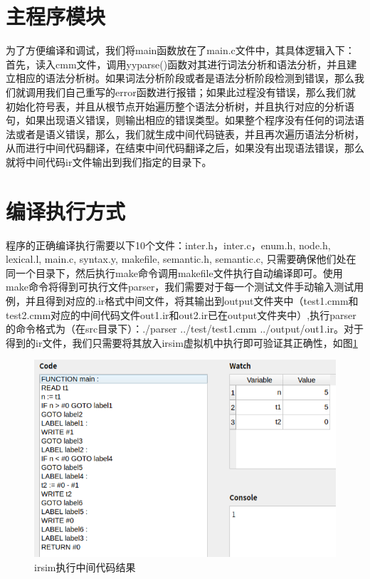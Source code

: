 \documentclass[lang=cn,11pt,a4paper,cite=authoryear]{elegantpaper}
\begin{document}
\section{主程序模块}
为了方便编译和调试，我们将main函数放在了main.c文件中，其具体逻辑入下：首先，读入cmm文件，调用yyparse()函数对其进行词法分析和语法分析，并且建立相应的语法分析树。如果词法分析阶段或者是语法分析阶段检测到错误，那么我们就调用我们自己重写的error函数进行报错；如果此过程没有错误，那么我们就初始化符号表，并且从根节点开始遍历整个语法分析树，并且执行对应的分析语句，如果出现语义错误，则输出相应的错误类型。如果整个程序没有任何的词法语法或者是语义错误，那么，我们就生成中间代码链表，并且再次遍历语法分析树，从而进行中间代码翻译，在结束中间代码翻译之后，如果没有出现语法错误，那么就将中间代码ir文件输出到我们指定的目录下。
\section{编译执行方式}
程序的正确编译执行需要以下10个文件：inter.h，inter.c，enum.h, node.h, lexical.l, main.c, syntax.y, makefile, semantic.h, semantic.c, 只需要确保他们处在同一个目录下，然后执行make命令调用makefile文件执行自动编译即可。使用make命令将得到可执行文件parser，我们需要对于每一个测试文件手动输入测试用例，并且得到对应的.ir格式中间文件，将其输出到output文件夹中（test1.cmm和test2.cmm对应的中间代码文件out1.ir和out2.ir已在output文件夹中）,执行parser的命令格式为（在src目录下）：./parser ../test/test1.cmm ../output/out1.ir。对于得到的ir文件，我们只需要将其放入irsim虚拟机中执行即可验证其正确性，如图\ref{pic4}

\begin{figure}[h]
	\centering
	\includegraphics[width=4.5in]{pics//p4.png}
	\caption{irsim执行中间代码结果}
	\label{pic4}
\end{figure}
\end{document}
